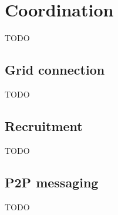 \section{Coordination}\label{coordination}
TODO

\subsection{Grid connection}
TODO

\subsection{Recruitment}
TODO

\subsection{P2P messaging}
TODO